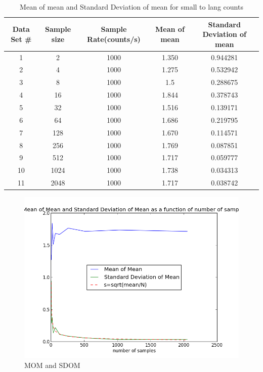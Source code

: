 \documentclass[letterpaper,12pt]{article}
\begin{document}
 
 
 \begin{table}
\caption{Mean of mean and Standard Deviation of mean for small to lang counts} %
\centering %
\begin{tabular}{c c c c c} %
\hline\hline %
Data Set \# & Sample size & Sample Rate(counts/s) & Mean of mean & Standard Deviation of mean\\ [0.5ex] %
\hline %
1 & 2 & 1000  &  1.350 &   0.944281   \\ %
2 & 4 & 1000  &  1.275   &  0.532942    \\
3 & 8 & 1000  &   1.5   &     0.288675 \\
4 & 16 &1000 &   1.844   &    0.378743  \\  
5 & 32 & 1000 &    1.516  &  0.139171 \\
6 & 64  & 1000 &    1.686 &   0.219795\\
7 & 128  & 1000 &   1.670 &   0.114571 \\
8 & 256 & 1000 &   1.769  &   0.087851\\
9 & 512 & 1000 &    1.717 &    0.059777\\
10  & 1024 & 1000 &  1.738   & 0.034313   \\  
11 & 2048 & 1000 &    1.717  &    0.038742\\ [1ex]
 \hline %
\end{tabular}
\label{table:nonlin} %
\end{table}
 
 
 
\begin{figure}
\centering
\includegraphics[scale=0.7]{part9.png}
\caption{MOM and SDOM }
\end{figure}
 
\end{document}
